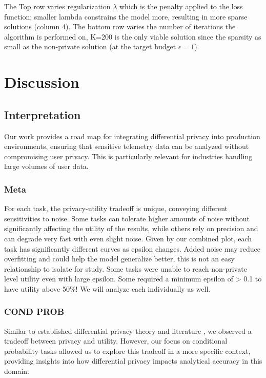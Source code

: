 \documentclass[12pt,letterpaper]{article}
\begin{document}
The Top row varies regularization $\lambda$ which is the penalty applied to the loss function; smaller lambda constrains the model more, resulting in more sparse solutions (column 4). The bottom row varies the number of iterations the algorithm is performed on, K=200 is the only viable solution since the sparsity as small as the non-private solution (at the target budget $\epsilon=1$).




\section{Discussion}


\subsection{Interpretation}
Our work provides a road map for integrating differential privacy into production environments, ensuring that sensitive telemetry data can be analyzed without compromising user privacy. This is particularly relevant for industries handling large volumes of user data. 

\subsubsection{Meta}
For each task, the privacy-utility tradeoff is unique, conveying different sensitivities to noise. Some tasks can tolerate higher amounts of noise without significantly affecting the utility of the results, while others rely on precision and can degrade very fast with even slight noise. Given by our combined plot, each task has significantly different curves as epsilon changes. Added noise may reduce overfitting and could help the model generalize better, this is not an easy relationship to isolate for study. Some tasks were unable to reach non-private level utility even with large epsilon. Some required a minimum epsilon of > 0.1 to have utility above 50\%! We will analyze each individually as well.

\subsubsection{COND PROB}
Similar to established differential privacy theory and literature \cite{DworkRoth}, we observed a tradeoff between privacy and utility. However, our focus on conditional probability tasks allowed us to explore this tradeoff in a more specific context, providing insights into how differential privacy impacts analytical accuracy in this domain.
\end{document}
